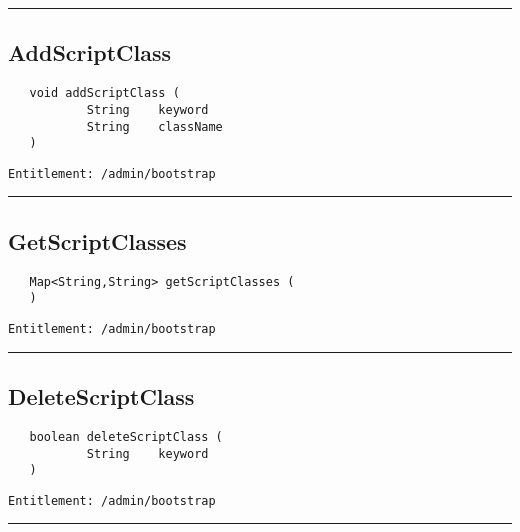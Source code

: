 \rule{12cm}{2pt}
\subsection{AddScriptClass}
\label{Api:AddScriptClass}
\begin{verbatim}
   void addScriptClass (
           String    keyword
           String    className
   )
\end{verbatim}
\begin{Verbatim}[fontsize=\small, formatcom=\color{Maroon}]
  Entitlement: /admin/bootstrap
\end{Verbatim}



\rule{12cm}{2pt}
\subsection{GetScriptClasses}
\label{Api:GetScriptClasses}
\begin{verbatim}
   Map<String,String> getScriptClasses (
   )
\end{verbatim}
\begin{Verbatim}[fontsize=\small, formatcom=\color{Maroon}]
  Entitlement: /admin/bootstrap
\end{Verbatim}



\rule{12cm}{2pt}
\subsection{DeleteScriptClass}
\label{Api:DeleteScriptClass}
\begin{verbatim}
   boolean deleteScriptClass (
           String    keyword
   )
\end{verbatim}
\begin{Verbatim}[fontsize=\small, formatcom=\color{Maroon}]
  Entitlement: /admin/bootstrap
\end{Verbatim}



\rule{12cm}{2pt}

